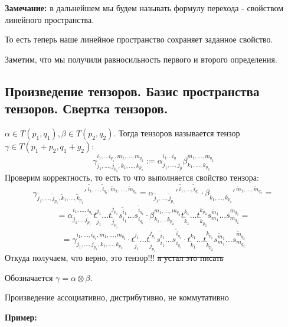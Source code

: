 \textbf{Замечание:} в дальнейшем мы будем называть формулу перехода - свойством линейного пространства.

То есть теперь наше линейное пространство сохраняет заданное свойство.


Заметим, что мы получили равносильность первого и второго определения.


\subsection{Произведение тензоров. Базис пространства тензоров. Свертка тензоров.}

 $\alpha \in T(p_1,q_1),\beta \in T(p_2,q_2)$. Тогда  тензоров называется тензор $\gamma \in T(p_1+p_2,q_1+g_2):$ 
$$\gamma^{i_1,\ldots i_{q_1},m_1,\ldots,m_{q_2}}_{j_1,\ldots,j_{p_1},k_1,\ldots, k_{p_2}}:= \alpha^{i_1\ldots i_q}_{j_1,\ldots,j_p} \beta^{m_1,\ldots,m_{q_2}}_{k_1,\ldots, k_{p_2}}$$
Проверим корректность, то есть то что выполняется свойство тензора:
$$\gamma_{\widetilde{j_1},\ldots,\widetilde{j}_{p_1}, \widetilde{k}_1,\ldots, \widetilde{k}_{p_2}}'^{\, \widetilde{i_1},\ldots,\widetilde{i}_{q_1}, \widetilde{m}_1,\ldots, \widetilde{m}_{q_2}} = \alpha_{\widetilde{j_1},\ldots,\widetilde{j}_{p_1}}'^{\, \widetilde{i_1},\ldots,\widetilde{i}_{q_1}} \cdot \beta_{ \widetilde{k}_1,\ldots, \widetilde{k}_{p_2}}'^{\,\widetilde{m}_1,\ldots, \widetilde{m}_{q_2}} = $$
$$= \alpha_{j_1,\ldots j_{p_1}}^{i_1,\ldots, i_{q_1}} t_{\widetilde{j}_1}^{j_1}\ldots t_{\widetilde{j}_{p_1}}^{j_{p_1}} s_{i_1}^{\widetilde{i}_1}\ldots s_{i_{q_1}}^{\widetilde{i}_{q_1}}\cdot \beta_{k_1,\ldots k_{p_2}}^{m_1,\ldots, m_{q_2}} t_{\widetilde{k}_1}^{k_1}\ldots t_{\widetilde{k}_{p_2}}^{k_{p_2}} s_{m_1}^{\widetilde{m}_1}\ldots s_{m_{q_2}}^{\widetilde{m}_{q_2}} = $$
$$=\gamma_{j_1,\ldots,j_{p_1},k_1,\ldots , k_{p_2}}^{i_1,\ldots, i_{q_1}, m_1,\ldots,m_{q_2}}\cdot t_{\widetilde{j}_1}^{j_1}\ldots t_{\widetilde{j}_{p_1}}^{j_{p_1}} s_{i_1}^{\widetilde{i}_1}\ldots s_{i_{q_1}}^{\widetilde{i}_{q_1}}\cdot t_{\widetilde{k}_1}^{k_1}\ldots t_{\widetilde{k}_{p_2}}^{k_{p_2}} s_{m_1}^{\widetilde{m}_1}\ldots s_{m_{q_2}}^{\widetilde{m}_{q_2}}$$
Откуда получаем, что верно, это тензор!!! \sout{я устал это писать}

Обозначается $\gamma = \alpha \otimes \beta$.

Произведение ассоциативно, дистрибутивно, не коммутативно



\textbf{Пример:}

